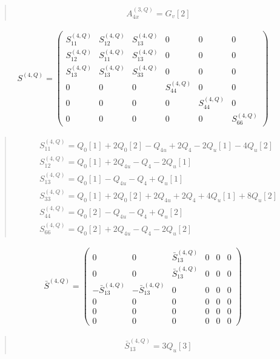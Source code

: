 \documentclass[fleqn,10pt]{jsarticle}
\begin{document}
\begin{quote}
\begin{align*}
& A^{(3,Q)}_{4x} = G_{v}[2]
\end{align*}
\end{quote}
\begin{align*}
S^{(4,Q)} = \begin{pmatrix} S^{(4,Q)}_{11} & S^{(4,Q)}_{12} & S^{(4,Q)}_{13} & 0 & 0 & 0 \\ S^{(4,Q)}_{12} & S^{(4,Q)}_{11} & S^{(4,Q)}_{13} & 0 & 0 & 0 \\ S^{(4,Q)}_{13} & S^{(4,Q)}_{13} & S^{(4,Q)}_{33} & 0 & 0 & 0 \\ 0 & 0 & 0 & S^{(4,Q)}_{44} & 0 & 0 \\ 0 & 0 & 0 & 0 & S^{(4,Q)}_{44} & 0 \\ 0 & 0 & 0 & 0 & 0 & S^{(4,Q)}_{66} \end{pmatrix}
\end{align*}
\begin{quote}
\begin{align*}
& S^{(4,Q)}_{11} = Q_{0}[1] + 2 Q_{0}[2] - Q_{4u} + 2 Q_{4} - 2 Q_{u}[1] - 4 Q_{u}[2] \\
& S^{(4,Q)}_{12} = Q_{0}[1] + 2 Q_{4u} - Q_{4} - 2 Q_{u}[1] \\
& S^{(4,Q)}_{13} = Q_{0}[1] - Q_{4u} - Q_{4} + Q_{u}[1] \\
& S^{(4,Q)}_{33} = Q_{0}[1] + 2 Q_{0}[2] + 2 Q_{4u} + 2 Q_{4} + 4 Q_{u}[1] + 8 Q_{u}[2] \\
& S^{(4,Q)}_{44} = Q_{0}[2] - Q_{4u} - Q_{4} + Q_{u}[2] \\
& S^{(4,Q)}_{66} = Q_{0}[2] + 2 Q_{4u} - Q_{4} - 2 Q_{u}[2]
\end{align*}
\end{quote}
\begin{align*}
\bar{S}^{(4,Q)} = \begin{pmatrix} 0 & 0 & \bar{S}^{(4,Q)}_{13} & 0 & 0 & 0 \\ 0 & 0 & \bar{S}^{(4,Q)}_{13} & 0 & 0 & 0 \\ - \bar{S}^{(4,Q)}_{13} & - \bar{S}^{(4,Q)}_{13} & 0 & 0 & 0 & 0 \\ 0 & 0 & 0 & 0 & 0 & 0 \\ 0 & 0 & 0 & 0 & 0 & 0 \\ 0 & 0 & 0 & 0 & 0 & 0 \end{pmatrix}
\end{align*}
\begin{quote}
\begin{align*}
& \bar{S}^{(4,Q)}_{13} = 3 Q_{u}[3]
\end{align*}
\end{quote}
\end{document}
